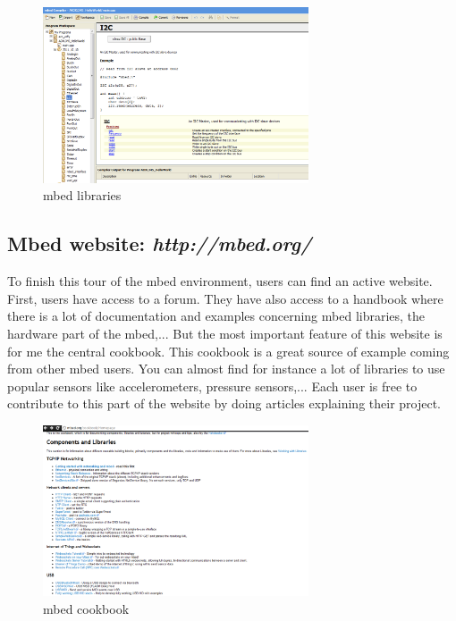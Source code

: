 \documentclass[pdftex,12pt,a4paper]{report}
\begin{document}
\begin{figure}[h!]
\centering
\includegraphics[width=0.7\textwidth]{./libraries.png}
\caption{mbed libraries}
\label{mbed libraries}
\end{figure}


\subsection{Mbed website: \textit{http://mbed.org/}}
To finish this tour of the mbed environment, users can find an active website. First, users have access to a forum. They have also access to a handbook where there is a lot of documentation and examples concerning mbed libraries, the hardware part of the mbed,... But the most important feature of this website is for me the central cookbook. This cookbook is a great source of example coming from other mbed users. You can almost find for instance a lot of libraries to use popular sensors like accelerometers, pressure sensors,... Each user is free to contribute to this part of the website by doing articles explaining their project. 

\begin{figure}[h!]
\centering
\includegraphics[width=0.7\textwidth]{./cookbook.png}
\caption{mbed cookbook}
\label{mbed cookbook}
\end{figure}
\end{document}
